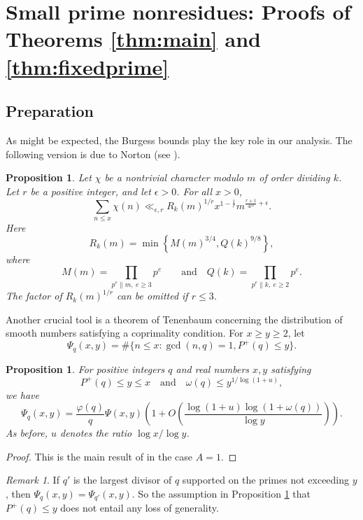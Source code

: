 \documentclass{scrartcl}
\theoremstyle{plain}
\newtheorem{prop}[thm]{Proposition}
\theoremstyle{remark}
\newtheorem*{remark}{Remark}
\renewcommand{\phi}{\varphi}
\newcommand{\1}{\mathbf{1}}
\begin{document}
\section{Small prime nonresidues: Proofs of Theorems \ref{thm:main} and \ref{thm:fixedprime}}

\subsection{Preparation} As might be expected, the Burgess bounds play the key role in our analysis. The following version is due to Norton (see \cite[Theorem 1.6]{norton98}).

\begin{prop}\label{prop:norton} Let $\chi$ be a nontrivial character modulo $m$ of order dividing $k$. Let $r$ be a positive integer,
and let $\epsilon > 0$. For all $x > 0$,
\[ \sum_{n \le x} \chi(n) \ll_{\epsilon,r} R_k(m)^{1/r} x^{1-\frac{1}{r}} m^{\frac{r+1}{4r^2}+\epsilon}. \]
Here
\[ R_k(m) = \min\left\{M(m)^{3/4},Q(k)^{9/8}\right\}, \]
where
\[ M(m) = \prod_{p^e \parallel m,~e\ge 3} p^e \qquad\text{and}\quad Q(k) = \prod_{p^e \parallel k,~e\ge 2} p^e. \]
The factor of $R_k(m)^{1/r}$ can be omitted if $r \le 3$.
\end{prop}

Another crucial tool is a theorem of Tenenbaum concerning the distribution of smooth numbers satisfying a coprimality condition. For $x\ge y\ge 2$, let \[ \Psi_q(x,y) = \#\{n\le x: \gcd(n,q)=1, P^{+}(q) \le y\}. \]

\begin{prop}\label{prop:FT} For positive integers $q$ and real numbers $x, y$ satisfying
\[ P^{+}(q) \le y \le x \quad\text{and}\quad \omega(q) \le y^{1/\log(1+u)}, \]
we have
\[ \Psi_q(x,y) = \frac{\phi(q)}{q} \Psi(x,y) \left(1+O\left(\frac{\log(1+u) \log(1+\omega(q))}{\log{y}}\right)\right). \]
As before, $u$ denotes the ratio $\log{x}/\log{y}$.
\end{prop}
\begin{proof} This is the main result of \cite{tenenbaum93} in the case $A=1$.\end{proof}

\begin{remark} If $q'$ is the largest divisor of $q$ supported on the primes not exceeding $y$, then $\Psi_{q}(x,y) = \Psi_{q'}(x,y)$. So the assumption in Proposition \ref{prop:FT} that $P^{+}(q) \le y$ does not entail any loss of generality.
\end{remark}
\end{document}
